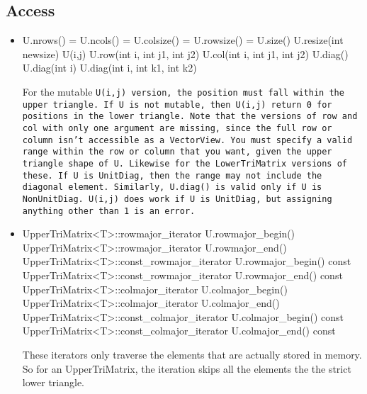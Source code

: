 \subsection{Access}
\label{TriMatrix_Access}

\begin{itemize}

\item
\begin{tmvcode}
U.nrows() = U.ncols() = U.colsize() = U.rowsize() = U.size()
U.resize(int newsize)
U(i,j)
U.row(int i, int j1, int j2)
U.col(int i, int j1, int j2)
U.diag()
U.diag(int i)
U.diag(int i, int k1, int k2)
\end{tmvcode}
For the mutable \tt{U(i,j)} version, the position must fall within the
upper triangle.  If \tt{U} is not mutable, then \tt{U(i,j)} return 0 for
positions in the lower triangle.
Note that the versions of \tt{row} and \tt{col} with only one argument are
missing, since the full row or column isn't accessible as a \tt{VectorView}.
You must specify a valid range within the row or column that you want, 
given the upper triangle shape of \tt{U}.  Likewise for the \tt{LowerTriMatrix}
versions of these.
If \tt{U} is \tt{UnitDiag}, then the range may not include the diagonal element.
Similarly, \tt{U.diag()} is valid only if \tt{U} is \tt{NonUnitDiag}.
\tt{U(i,j)} does work if \tt{U} is \tt{UnitDiag}, but assigning anything
other than \tt{1} is an error.

\item
\begin{tmvcode}
UpperTriMatrix<T>::rowmajor_iterator U.rowmajor_begin()
UpperTriMatrix<T>::rowmajor_iterator U.rowmajor_end()
UpperTriMatrix<T>::const_rowmajor_iterator U.rowmajor_begin() const
UpperTriMatrix<T>::const_rowmajor_iterator U.rowmajor_end() const
UpperTriMatrix<T>::colmajor_iterator U.colmajor_begin()
UpperTriMatrix<T>::colmajor_iterator U.colmajor_end()
UpperTriMatrix<T>::const_colmajor_iterator U.colmajor_begin() const
UpperTriMatrix<T>::const_colmajor_iterator U.colmajor_end() const
\end{tmvcode}
These iterators only traverse the elements that are actually stored in memory. So for an UpperTriMatrix, the iteration skips all the elements the the strict lower triangle.


\end{itemize}
